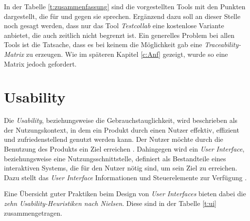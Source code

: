 \documentclass[11pt,a4paper]{report}
\begin{document}
In der Tabelle \ref{t:zusammenfassung} sind die vorgestellten Tools mit den Punkten dargestellt, die für und gegen sie sprechen. Ergänzend dazu soll an dieser Stelle noch gesagt werden, dass nur das Tool \textit{Testcollab} eine kostenlose Variante anbietet, die auch zeitlich nicht begrenzt ist. Ein generelles Problem bei allen Tools ist die Tatsache, dass es bei keinem die Möglichkeit gab eine \textit{Traceability-Matrix} zu erzeugen. Wie im späteren Kapitel \ref{c:Anf} gezeigt, wurde so eine Matrix jedoch gefordert.


\section{Usability}

Die \textit{Usability}, beziehungsweise die Gebrauchstauglichkeit, wird beschrieben als
der Nutzungskontext, in dem ein Produkt durch einen Nutzer effektiv, effizient und zufriedenstellend genutzt werden kann. Der Nutzer möchte durch die Benutzung des Produkts ein Ziel erreichen \cite{isousa}. Dahingegen wird ein \textit{User Interface}, beziehungsweise eine Nutzungsschnittstelle, definiert als Bestandteile eines interaktiven Systems, die für den Nutzer nötig sind, um sein Ziel zu erreichen. Dazu stellt das \textit{User Interface} Informationen und Steuerelemente zur Verfügung \cite{isoui}.

Eine Übersicht guter Praktiken beim Design von \textit{User Interfaces} bieten dabei die \textit{zehn Usability-Heuristiken nach Nielsen}. Diese sind in der Tabelle \ref{t:ui} zusammengetragen.
\end{document}
